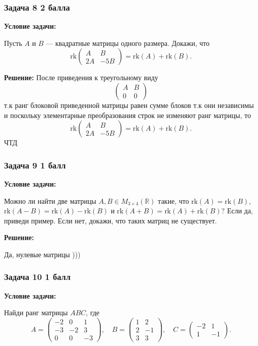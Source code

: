 \documentclass[a4paper,12pt]{article}
\begin{document}
\subsubsection{Задача 8 \hfill 2 балла}
\textbf{Условие задачи:}

Пусть \( A \) и \( B \) — квадратные матрицы одного размера. Докажи, что
\[
\text{rk} \begin{pmatrix} A & B \\ 2A & -5B \end{pmatrix} = \text{rk}(A) + \text{rk}(B).
\]

\textbf{Решение:}
После приведения к треугольному виду
\[
\begin{pmatrix}
    A & B\\
    0 & 0
\end{pmatrix}
\]
т.к  ранг блоковой приведенной матрицы равен сумме блоков т.к они независимы и поскольку элементарные преобразования строк не изменяют ранг матрицы, то
\[
\text{rk} \begin{pmatrix} A & B \\ 2A & -5B \end{pmatrix} = \text{rk}(A) + \text{rk}(B).
\] ЧТД

\subsubsection{Задача 9 \hfill 1 балл}
\textbf{Условие задачи:}

Можно ли найти две матрицы \( A, B \in M_{3 \times 4}(\mathbb{R}) \) такие, что \( \text{rk}(A) = \text{rk}(B) \), \( \text{rk}(A - B) = \text{rk}(A) - \text{rk}(B) \) и \( \text{rk}(A + B) = \text{rk}(A) + \text{rk}(B) \)? Если да, приведи пример. Если нет, докажи, что таких матриц не существует.

\textbf{Решение:}

Да, нулевые матрицы )))

\subsubsection{Задача 10 \hfill 1 балл}
\textbf{Условие задачи:}

Найди ранг матрицы \( ABC \), где
\[
A =
\begin{pmatrix}
-2 & 0 & 1 \\
-3 & -2 & 3 \\
0 & 0 & -3
\end{pmatrix},
\quad
B =
\begin{pmatrix}
1 & 2 \\
2 & -1 \\
3 & 3
\end{pmatrix},
\quad
C =
\begin{pmatrix}
-2 & 1 \\
1 & -1
\end{pmatrix}.
\]
\end{document}
